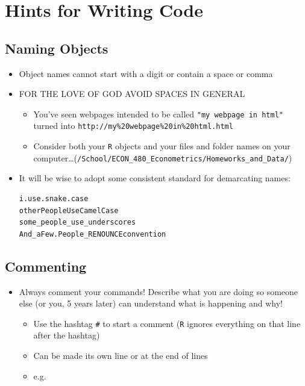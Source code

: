 \documentclass[]{book}
\providecommand{\tightlist}{%
  \setlength{\itemsep}{0pt}\setlength{\parskip}{0pt}}
\theoremstyle{definition}
\theoremstyle{definition}
\theoremstyle{definition}
\theoremstyle{remark}
\begin{document}
\section{Hints for Writing Code}\label{hints-for-writing-code}

\subsection{Naming Objects}\label{naming-objects}

\begin{itemize}
\item
  Object names cannot start with a digit or contain a space or comma
\item
  FOR THE LOVE OF GOD AVOID SPACES IN GENERAL

  \begin{itemize}
  \tightlist
  \item
    You've seen webpages intended to be called
    \texttt{"my\ webpage\ in\ html"} turned into
    \texttt{http://my\%20webpage\%20in\%20html.html}
  \item
    Consider both your \texttt{R} objects and your files and folder
    names on your
    computer\ldots{}(\texttt{/School/ECON\_480\_Econometrics/Homeworks\_and\_Data/})
  \end{itemize}
\item
  It will be wise to adopt some consistent standard for demarcating
  names:

\begin{verbatim}
i.use.snake.case
otherPeopleUseCamelCase
some_people_use_underscores
And_aFew.People_RENOUNCEconvention
\end{verbatim}
\end{itemize}

\subsection{Commenting}\label{commenting}

\begin{itemize}
\tightlist
\item
  Always comment your commands! Describe what you are doing so someone
  else (or you, 5 years later) can understand what is happening and why!

  \begin{itemize}
  \tightlist
  \item
    Use the hashtag \texttt{\#} to start a comment (\texttt{R} ignores
    everything on that line after the hashtag)
  \item
    Can be made its own line or at the end of lines
  \item
    e.g.
  \end{itemize}
\end{itemize}
\end{document}
